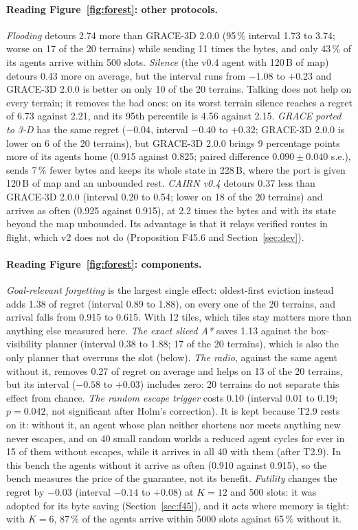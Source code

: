 \documentclass[11pt,a4paper]{article}
\begin{document}
\paragraph{Reading Figure~\ref{fig:forest}: other protocols.}
\emph{Flooding} detours 2.74 more than GRACE-3D 2.0.0 (95\,\% interval 1.73 to 3.74; worse on 17 of the 20
terrains) while sending 11 times the bytes, and only 43\,\% of its agents arrive within 500 slots. \emph{Silence}
(the v0.4 agent with 120\,B of map) detours 0.43 more on average, but the interval runs from $-1.08$ to $+0.23$ and
GRACE-3D 2.0.0 is better on only 10 of the 20 terrains. Talking does not help on every terrain; it removes the bad
ones: on its worst terrain silence reaches a regret of 6.73 against 2.21, and its 95th percentile is 4.56 against
2.15. \emph{GRACE ported to 3-D} has the same regret ($-0.04$, interval $-0.40$ to $+0.32$; GRACE-3D 2.0.0 is lower
on 6 of the 20 terrains), but GRACE-3D 2.0.0 brings 9 percentage points more of its agents home (0.915 against 0.825;
paired difference $0.090\pm0.040$ s.e.), sends 7\,\% fewer bytes and keeps its whole state in 228\,B, where the port
is given 120\,B of map and an unbounded rest. \emph{CAIRN v0.4} detours 0.37 less than GRACE-3D 2.0.0 (interval 0.20
to 0.54; lower on 18 of the 20 terrains) and arrives as often (0.925 against 0.915), at 2.2 times the bytes and with
its state beyond the map unbounded. Its advantage is that it relays verified routes in flight, which v2 does not do
(Proposition F45.6 and Section~\ref{sec:dev}).

\paragraph{Reading Figure~\ref{fig:forest}: components.}
\emph{Goal-relevant forgetting} is the largest single effect: oldest-first eviction instead adds 1.38 of regret
(interval 0.89 to 1.88), on every one of the 20 terrains, and arrival falls from 0.915 to 0.615. With 12 tiles,
which tiles stay matters more than anything else measured here. \emph{The exact sliced A*} saves 1.13 against the
box-visibility planner (interval 0.38 to 1.88; 17 of the 20 terrains), which is also the only planner that overruns
the slot (below). \emph{The radio}, against the same agent without it, removes 0.27 of regret on average and helps on
13 of the 20 terrains, but its interval ($-0.58$ to $+0.03$) includes zero: 20 terrains do not separate this effect
from chance. \emph{The random escape trigger} costs 0.10 (interval 0.01 to 0.19; $p=0.042$, not significant after
Holm's correction). It is kept because T2.9 rests on it: without it, an agent whose plan neither shortens nor meets
anything new never escapes, and on 40 small random worlds a reduced agent cycles for ever in 15 of them without
escapes, while it arrives in all 40 with them (after T2.9). In this bench the agents without it arrive as often (0.910 against 0.915),
so the bench measures the price of the guarantee, not its benefit. \emph{Futility} changes the regret by $-0.03$
(interval $-0.14$ to $+0.08$) at $K=12$ and 500 slots: it was adopted for its byte saving (Section~\ref{sec:f45}),
and it acts where memory is tight: with $K=6$, 87\,\% of the agents arrive within 5000 slots against 65\,\% without it.
\end{document}
